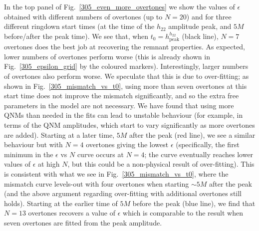 In the top panel of Fig.~\ref{305_even_more_overtones} we show the values of $\epsilon$ obtained with different numbers of overtones (up to $N=20$) and for three different ringdown start times (at the time of the $h_{22}$ amplitude peak, and $5M$ before/after the peak time). 
We see that, when $t_0 = h_\mathrm{peak}^{h_{22}}$ (black line), $N=7$ overtones does the best job at recovering the remnant properties. 
As expected, lower numbers of overtones perform worse (this is already shown in Fig.~\ref{305_epsilon_grid} by the coloured markers).
Interestingly, larger numbers of overtones also perform worse.
We speculate that this is due to over-fitting; as shown in Fig.~\ref{305_mismatch_vs_t0}, using more than seven overtones at this start time does not improve the mismatch significantly, and so the extra free parameters in the model are not necessary.
We have found that using more QNMs than needed in the fits can lead to unstable behaviour (for example, in terms of the QNM amplitudes, which start to vary significantly as more overtones are added). 
Starting at a later time, $5M$ after the peak (red line), we see a similar behaviour but with $N=4$ overtones giving the lowest $\epsilon$ (specifically, the first minimum in the $\epsilon$ vs $N$ curve occurs at $N=4$; the curve eventually reaches lower values of $\epsilon$ at high $N$, but this could be a non-physical result of over-fitting).
This is consistent with what we see in Fig.~\ref{305_mismatch_vs_t0}, where the mismatch curve levels-out with four overtones when starting $\sim 5M$ after the peak (and the above argument regarding over-fitting with additional overtones still holds).
Starting at the earlier time of $5M$ before the peak (blue line), we find that $N=13$ overtones recovers a value of $\epsilon$ which is comparable to the result when seven overtones are fitted from the peak amplitude. 

